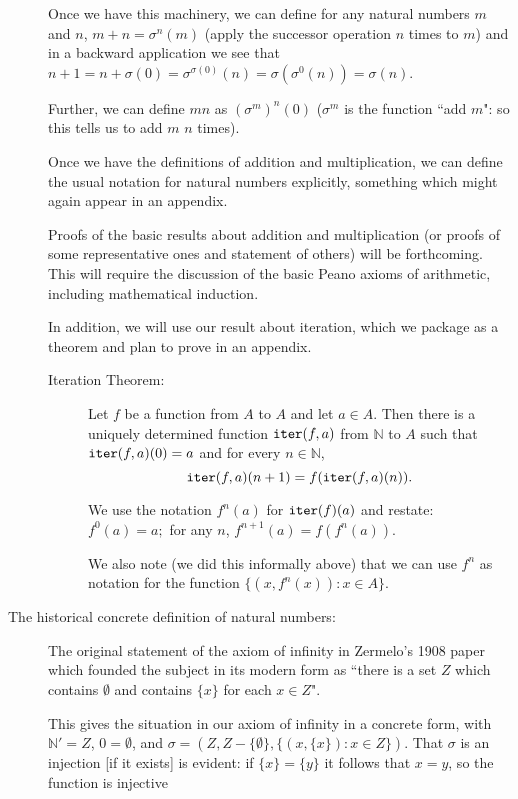 \documentclass[12pt]{article}
\begin{document}
\begin{description}
Once we have this machinery, we can define for any natural numbers $m$ and $n$, $m+n = \sigma^n(m)$ (apply the successor operation $n$ times to $m$) and in a backward application we see that $n+1 = n+\sigma(0) = \sigma^{\sigma(0)}(n) = \sigma(\sigma^0(n)) = \sigma(n)$.

Further, we can define $mn$ as $(\sigma^m)^n(0)$ ($\sigma^m$ is the function ``add $m$":  so this tells us to add $m$ $n$ times).

Once we have the definitions of addition and multiplication, we can define the usual notation for natural numbers explicitly, something which might again appear in an appendix.

Proofs of the basic results about addition and multiplication (or proofs of some representative ones and statement of others) will be forthcoming.  This will require the discussion of the basic Peano axioms of arithmetic, including mathematical induction.

In addition, we will use our result about iteration, which we package as a theorem and plan to prove in an appendix.

\begin{description}

\item[Iteration Theorem:]  Let $f$ be a function from $A$ to $A$ and let $a \in A$.  Then there is a uniquely determined function ${\tt iter}(f,a)$ from $\mathbb N$ to $A$ such that ${\tt iter}(f,a)(0) = a$ and for every $n \in \mathbb N$, $${\tt iter}(f,a)(n+1)= f({\tt iter}(f,a)(n)).$$

We use the notation $f^n(a)$ for ${\tt iter}(f)(a)$ and restate:  $f^0(a)=a;$  for any $n$, $f^{n+1}(a) = f(f^n(a))$.

We also note (we did this informally above)  that we can use $f^n$ as notation for the function $\{(x,f^n(x)):x \in A\}$.

\end{description}

\item[The historical concrete definition of natural numbers:]

The original statement of the axiom of infinity in Zermelo's 1908 paper which founded the subject in its modern form
as ``there is a set $Z$ which contains $\emptyset$ and contains $\{x\}$ for each $x \in Z$".

This gives the situation in our axiom of infinity in a concrete form, with $\mathbb N'=Z$, $0=\emptyset$,
and $\sigma = (Z,Z-\{\emptyset\},\{(x,\{x\}):x \in Z\})$.  That $\sigma$ is an injection [if it exists] is evident:  if $\{x\} = \{y\}$ it follows that $x=y$, so the function is injective


\end{description}
\end{document}
